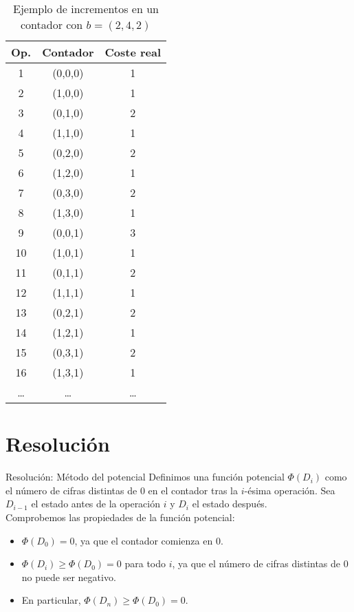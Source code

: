 \documentclass[aspectratio=169]{beamer}
\begin{document}
\begin{frame}{}
    \begin{table}
        \centering
        {\small
        \begin{tabular}{|c|c|c|}
            \hline
            	\textbf{Op.} & \textbf{Contador} & \textbf{Coste real} \\
            \hline
            1 & (0,0,0) & 1 \\
            2 & (1,0,0) & 1 \\
            3 & (0,1,0) & 2 \\
            4 & (1,1,0) & 1 \\
            5 & (0,2,0) & 2 \\
            6 & (1,2,0) & 1 \\
            7 & (0,3,0) & 2 \\
            8 & (1,3,0) & 1 \\
            9 & (0,0,1) & 3 \\
            10 & (1,0,1) & 1 \\
            11 & (0,1,1) & 2 \\
            12 & (1,1,1) & 1 \\
            13 & (0,2,1) & 2 \\
            14 & (1,2,1) & 1 \\
            15 & (0,3,1) & 2 \\
            16 & (1,3,1) & 1 \\
            \ldots & \ldots & \ldots \\
            \hline
        \end{tabular}
        }
        \caption{Ejemplo de incrementos en un contador con $b = (2,4,2)$}
    \end{table}
\end{frame}

\section{Resolución}

\begin{frame}{Resolución: Método del potencial}
    Definimos una función potencial $\Phi(D_i)$ como el número de cifras distintas de $0$ en el contador tras la $i$-ésima operación. Sea $D_{i-1}$ el estado antes de la operación $i$ y $D_i$ el estado después.\\
    
    Comprobemos las propiedades de la función potencial:
    \begin{itemize}
        \item $\Phi(D_0) = 0$, ya que el contador comienza en $0$.
        \item $\Phi(D_i) \geq \Phi(D_0) = 0$ para todo $i$, ya que el número de cifras distintas de $0$ no puede ser negativo.
        \item En particular, $\Phi(D_n) \geq \Phi(D_0) = 0$. 
    \end{itemize}
\end{frame}
\end{document}
